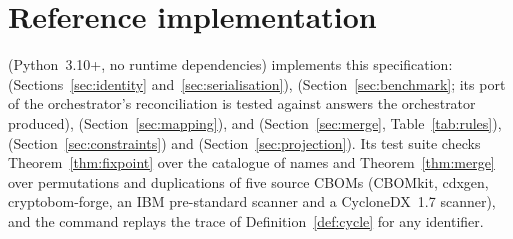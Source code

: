 \documentclass[11pt,a4paper]{article}
\theoremstyle{definition}
\theoremstyle{plain}
\begin{document}
\section{Reference implementation}
 (Python~3.10+, no runtime dependencies) implements this specification:
 (Sections~\ref{sec:identity} and~\ref{sec:serialisation}),
 (Section~\ref{sec:benchmark}; its port of the orchestrator's
reconciliation is tested against answers the orchestrator produced),
 (Section~\ref{sec:mapping}),  and 
(Section~\ref{sec:merge}, Table~\ref{tab:rules}),  (Section~\ref{sec:constraints})
and  (Section~\ref{sec:projection}). Its test suite checks
Theorem~\ref{thm:fixpoint} over the catalogue of names and Theorem~\ref{thm:merge} over
permutations and duplications of five source CBOMs (CBOMkit, cdxgen, cryptobom-forge, an IBM
pre-standard scanner and a CycloneDX~1.7 scanner), and the command  replays
the trace of Definition~\ref{def:cycle} for any identifier.
\end{document}

